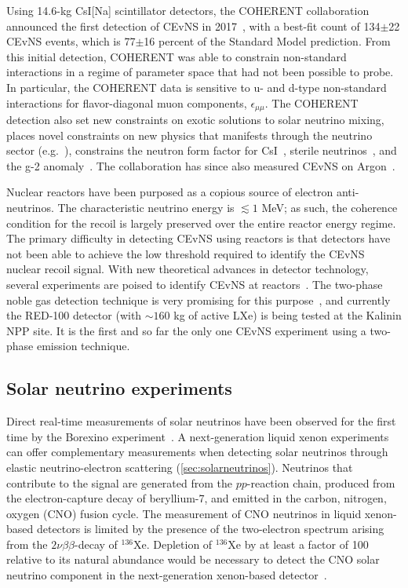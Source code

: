Using 14.6-kg CsI[Na] scintillator detectors, the COHERENT collaboration announced the first detection of CEvNS in 2017~\cite{Akimov:2017ade}, with a best-fit count of 134$\pm$22 CEvNS events, which is 77$\pm$16 percent of the Standard Model prediction. From this initial detection, COHERENT was able to constrain non-standard interactions in a regime of parameter space that had not been possible to probe. In particular, the COHERENT data is sensitive to u- and d-type non-standard interactions for flavor-diagonal muon components, $\epsilon_{\mu \mu}$. The COHERENT detection also set new constraints on exotic solutions to solar neutrino mixing, places novel constraints on new physics that manifests through the neutrino sector (e.g.~\cite{delaVega:2021mhj}), constrains the neutron form factor for CsI~\cite{Ciuffoli:2018qem}, sterile neutrinos~\cite{Coloma:2017egw,Coloma:2017ncl}, and the g-2 anomaly~\cite{Liao:2017uzy}. The collaboration has since also measured CEvNS on Argon~\cite{Akimov:2020pdx}.

Nuclear reactors have been purposed as a copious source of electron anti-neutrinos. The characteristic neutrino energy is $\lesssim 1$ MeV; as such, the coherence condition for the recoil is largely preserved over the entire reactor energy regime. The primary difficulty in detecting CEvNS using reactors is that detectors have not been able to achieve the low threshold required to identify the CEvNS nuclear recoil signal. With new theoretical advances in detector technology, several experiments are poised to identify CEvNS at reactors~\cite{Soma:2014zgm,Aguilar-Arevalo:2016khx,Agnolet:2016zir,Strauss:2017cuu,Leder:2017lva}. The two-phase noble gas detection technique is very promising for this purpose~\cite{Akimov:2019ogx}, and currently the RED-100 detector (with $\sim 160$ kg of active LXe) is being tested at the Kalinin NPP site. It is the first and so far the only one CEvNS experiment using a two-phase emission technique.

\subsection{Solar neutrino experiments}

Direct real-time measurements of solar neutrinos have been observed for the first time by the Borexino experiment~\cite{Arpesella:2007xf, Agostini:2018uly, Agostini:2020mfq}. A next-generation liquid xenon experiments can offer complementary measurements when detecting solar neutrinos through elastic neutrino-electron scattering (\autoref{sec:solarneutrinos}). Neutrinos that contribute to the signal are generated from the $pp$-reaction chain, produced from the electron-capture decay of beryllium-7, and emitted in the carbon, nitrogen, oxygen (CNO) fusion cycle. The measurement of CNO neutrinos in liquid xenon-based detectors is limited by the presence of the two-electron spectrum arising from the $2\nu \beta \beta$-decay of $^{136}$Xe. Depletion of $^{136}$Xe by at least a factor of 100 relative to its natural abundance would be necessary to detect the CNO solar neutrino component in the next-generation xenon-based detector~\cite{Newstead:2018muu}.  

